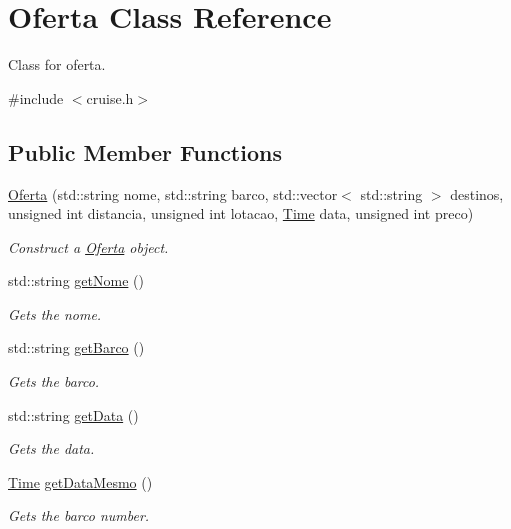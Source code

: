 \hypertarget{classOferta}{}\section{Oferta Class Reference}
\label{classOferta}


Class for oferta.  




{\ttfamily \#include $<$cruise.\+h$>$}

\subsection*{Public Member Functions}
\begin{DoxyCompactItemize}
\item 
\hyperlink{classOferta_a49a53f9d6ba51f97a3b428c8fac98d7f}{Oferta} (std\+::string nome, std\+::string barco, std\+::vector$<$ std\+::string $>$ destinos, unsigned int distancia, unsigned int lotacao, \hyperlink{classTime}{Time} data, unsigned int preco)
\begin{DoxyCompactList}\small\item\em Construct a \hyperlink{classOferta}{Oferta} object. \end{DoxyCompactList}\item 
std\+::string \hyperlink{classOferta_a16da38d9f369b000cb544c34200707b8}{get\+Nome} ()
\begin{DoxyCompactList}\small\item\em Gets the nome. \end{DoxyCompactList}\item 
std\+::string \hyperlink{classOferta_aaed9b5937f9f33d2980fcc13ac02132c}{get\+Barco} ()
\begin{DoxyCompactList}\small\item\em Gets the barco. \end{DoxyCompactList}\item 
std\+::string \hyperlink{classOferta_a2b156b75371ad59af54ad96ad79c9d1e}{get\+Data} ()
\begin{DoxyCompactList}\small\item\em Gets the data. \end{DoxyCompactList}\item 
\hyperlink{classTime}{Time} \hyperlink{classOferta_a13ebfcae88d39a90f0c66368534ed335}{get\+Data\+Mesmo} ()
\begin{DoxyCompactList}\small\item\em Gets the barco number. \end{DoxyCompactList}\item 

\end{DoxyCompactItemize}
